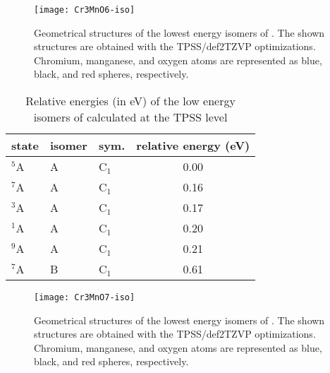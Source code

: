 \begin{figure}
	\centering
	\texttt{[image: Cr3MnO6-iso]}
	\caption{Geometrical structures of the lowest energy isomers of . The shown structures are obtained with the TPSS/def2TZVP optimizations. Chromium, manganese, and oxygen atoms are represented as blue, black, and red spheres, respectively.}
	\label{figs:Cr3MnO6}
\end{figure}








\begin{table}[]
	\centering
	\caption{Relative energies (in eV) of the low energy isomers of  calculated at the TPSS level}
	\begin{tabular}{@{}lllc@{}}
	\toprule
	state & isomer & sym. & relative energy (eV) \\ \midrule
	$^5$A    & A      & C$_1$   & 0.00                 \\
	$^7$A    & A      & C$_1$   & 0.16                 \\
	$^3$A    & A      & C$_1$   & 0.17                 \\
	$^1$A    & A      & C$_1$   & 0.20                 \\
	$^9$A    & A      & C$_1$   & 0.21                 \\
	$^7$A    & B      & C$_1$   & 0.61                 \\ \bottomrule
	\end{tabular}
\end{table}


\FloatBarrier

\begin{figure}
	\centering
	\texttt{[image: Cr3MnO7-iso]}
	\caption{Geometrical structures of the lowest energy isomers of . The shown structures are obtained with the TPSS/def2TZVP optimizations. Chromium, manganese, and oxygen atoms are represented as blue, black, and red spheres, respectively.}
	\label{figs:Cr3MnO7}
\end{figure}







